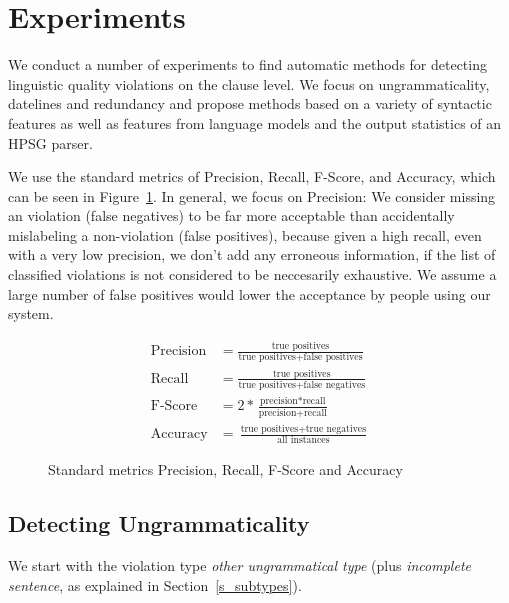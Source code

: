 \documentclass[a4paper,10pt]{scrartcl}
\theoremstyle{style}
\begin{document}
\newpage
\section{Experiments}
\label{experiments}
We conduct a number of experiments to find automatic methods for detecting linguistic quality violations on the clause level. We focus on ungrammaticality, datelines and redundancy and propose methods based on a variety of syntactic features as well as features from language models and the output statistics of an HPSG parser.

We use the standard metrics of Precision, Recall, F-Score, and Accuracy, which can be seen in Figure~\ref{metrics}. In general, we focus on Precision: We consider missing an violation (false negatives) to be far more acceptable than accidentally mislabeling a non-violation (false positives), because given a high recall, even with a very low precision, we don't add any erroneous information, if the list of classified violations is not considered to be neccesarily exhaustive. We assume a large number of false positives would lower the acceptance by people using our system.

\begin{figure}[H]
	\begin{subequations*}
	\begin{align*}
		\text{Precision} &= \frac{\text{true positives}}{\text{true positives} + \text{false positives}}\\
		\text{Recall} &= \frac{\text{true positives}}{\text{true positives} + \text{false negatives}}\\
		\text{F-Score} &= 2*\frac{\text{precision}*\text{recall}}{\text{precision}+\text{recall}}\\
		\text{Accuracy} &= \frac{\text{true positives}+\text{true negatives}}{\text{all instances}}
	\end{align*}
	\end{subequations*}
	\label{metrics}
	\caption{Standard metrics Precision, Recall, F-Score and Accuracy}
\end{figure}

\newpage
\subsection{Detecting Ungrammaticality}
\label{sec_unknowntokens}
We start with the violation type \textit{other ungrammatical type} (plus \textit{incomplete sentence}, as explained in Section~\ref{s_subtypes}).
\end{document}

